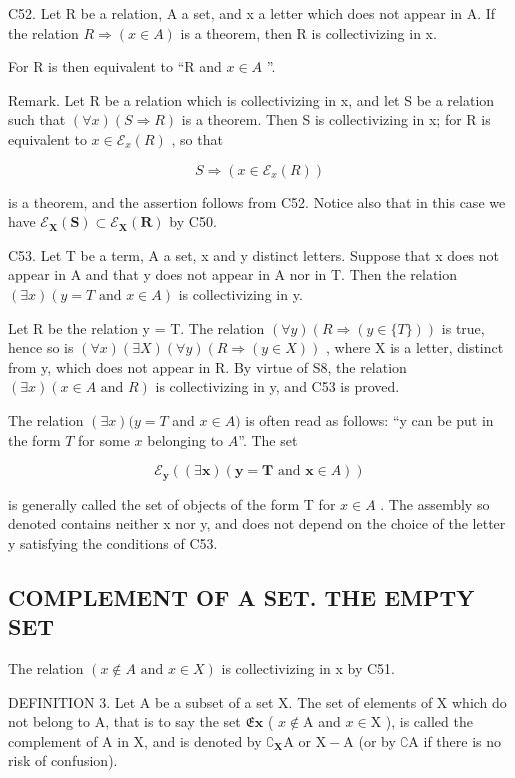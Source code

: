C52. Let R be a relation, A a set, and x a letter which does not appear in A. If the relation \(R \Longrightarrow (x \in A)\) is a theorem, then R is collectivizing in x.

For R is then equivalent to ``R and \(x \in A\) ''.

Remark. Let R be a relation which is collectivizing in x, and let S be a relation such that \((\forall x)(S \Longrightarrow R)\) is a theorem. Then S is collectivizing in x; for R is equivalent to \(x \in \mathcal{E}_{x}(R)\) , so that

\[
S \Longrightarrow (x \in \mathcal {E} _ {x} (R))
\]

is a theorem, and the assertion follows from C52. Notice also that in this case we have \(\mathcal{E}_{\pmb{X}}(\pmb{S}) \subset \mathcal{E}_{\pmb{X}}(\pmb{R})\) by C50.

C53. Let T be a term, A a set, x and y distinct letters. Suppose that x does not appear in A and that y does not appear in A nor in T. Then the relation \((\exists x)(y = T \text{ and } x \in A)\) is collectivizing in y.

Let R be the relation y = T. The relation \((\forall y)(R \Longrightarrow (y \in \{T\}))\) is true, hence so is \((\forall x)(\exists X)(\forall y)(R \Longrightarrow (y \in X))\) , where X is a letter, distinct from y, which does not appear in R. By virtue of S8, the relation \((\exists x)(x \in A \text{ and } R)\) is collectivizing in y, and C53 is proved.

The relation \((\exists x)(y = T\) and \(x \in A)\) is often read as follows: ``y can be put in the form \(T\) for some \(x\) belonging to \(A\)''. The set

\[
\mathcal {E} _ {\boldsymbol {y}} ((\exists \boldsymbol {x}) (\boldsymbol {y} = \boldsymbol {T} \text {   and   } \boldsymbol {x} \in A))
\]

is generally called the set of objects of the form T for \(x \in A\) . The assembly so denoted contains neither x nor y, and does not depend on the choice of the letter y satisfying the conditions of C53.

\subsection{COMPLEMENT OF A SET. THE EMPTY SET}

The relation \((x \notin A \text{ and } x \in X)\) is collectivizing in x by C51.

DEFINITION 3. Let A be a subset of a set X. The set of elements of X which do not belong to A, that is to say the set \(\mathfrak{E}\mathbf{x}\) ( \(x \notin \mathrm{A}\) and \(x \in \mathrm{X}\) ), is called the complement of A in X, and is denoted by \(\complement_{\mathbf{X}}\mathrm{A}\) or \(\mathrm{X} - \mathrm{A}\) (or by \(\complement\mathrm{A}\) if there is no risk of confusion).


